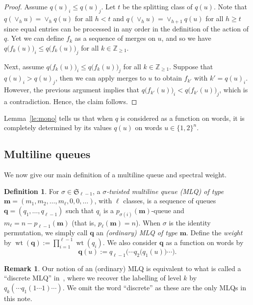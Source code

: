 \documentclass[reqno]{amsart}
\newcommand{\0}{\phantom{c}}
\newcommand{\merge}[1]{\vee_{#1}} %
\newcommand{\SymGp}[1]{\mathfrak{S}_{#1}} %
\DeclareMathOperator{\wt}{wt} %
\newcommand{\mm}{\mathbf{m}}
\newcommand{\qq}{\mathbf{q}}
\newcommand{\ZZ}{\mathbb{Z}}
\let\prodnonlimits\prod
\renewcommand{\prod}{\prodnonlimits\limits}
\newcommand{\tup}[1]{\left( #1 \right)}
\newcommand{\defn}[1]{{\color{darkred}\emph{#1}}} %
\theoremstyle{plain}
\theoremstyle{definition}
\newtheorem{dfn}[thm]{Definition}
\newtheorem{remark}[thm]{Remark}
\numberwithin{equation}{section}
\begin{document}
\begin{proof}
Assume $q(u)_i \leq q(u)_j$.
Let $t$ be the splitting class of $q(u)$.
Note that $q(\merge{h} u) = \merge{h} q(u)$ for all $h < t$ and $q(\merge{h} u) = \merge{h+1} q(u)$ for all $h \geq t$ since equal entries can be processed in any order in the definition of the action of $q$.
Yet we can define $f_k$ as a sequence of merges on $u$, and so we have $q\bigl( f_k(u) \bigr)_i \leq q\bigl( f_k(u) \bigr)_j$ for all $k \in \ZZ_{\geq 1}$.

Next, assume $q\bigl( f_k(u) \bigr)_i \leq q\bigl( f_k(u) \bigr)_j$ for all $k \in \ZZ_{\geq 1}$.
Suppose that $q(u)_i > q(u)_j$, then we can apply merges to $u$ to obtain $f_{k'}$ with $k' = q(u)_i$.
However, the previous argument implies that $q\bigl(f_{k'}(u) \bigr)_i < q\bigl(f_{k'}(u) \bigr)_j$, which is a contradiction.
Hence, the claim follows.
\end{proof}

Lemma~\ref{le:mono} tells us that when $q$ is considered as a function on words, it is completely determined by its values $q(u)$ on words $u \in \{1,2\}^n$.


\subsection{Multiline queues}

We now give our main definition of a multiline queue and spectral weight.

\begin{dfn}
For $\sigma \in \SymGp{\ell-1}$, a \defn{$\sigma$-twisted multiline queue (MLQ) of type $\mm = \tup{m_1, m_2, \ldots, m_\ell, 0, 0, \ldots}$}, with $\ell$ classes, is a sequence of queues $\qq = (q_1, \dotsc, q_{\ell-1})$ such that $q_i$ is a $p_{\sigma(i)}(\mm)$-queue and $m_{\ell} = n - p_{\ell-1}(\mm)$ (that is, $p_\ell(\mm) = n$).
When $\sigma$ is the identity permutation, we simply call $\qq$ an \defn{(ordinary) MLQ of type $\mm$}.
Define the \defn{weight} by $\wt(\qq) := \prod_{i=1}^{\ell-1} \wt(q_i)$.
We also consider $\qq$ as a function on words by
\[
\qq(u) := q_{\ell-1}\bigl( \cdots q_2\bigl( q_1(u) \bigr) \cdots \bigr).
\]
\end{dfn}

\begin{remark}
Our notion of an (ordinary) MLQ is equivalent to what is called a ``discrete MLQ'' in~\cite[\S 2.2]{AasLin17}, where we recover the labelling of level $k$ by $q_k( \cdots q_1(1 \dotsm 1) \cdots )$.
We omit the word ``discrete'' as these are the only MLQs in this note.
\end{remark}
\end{document}
